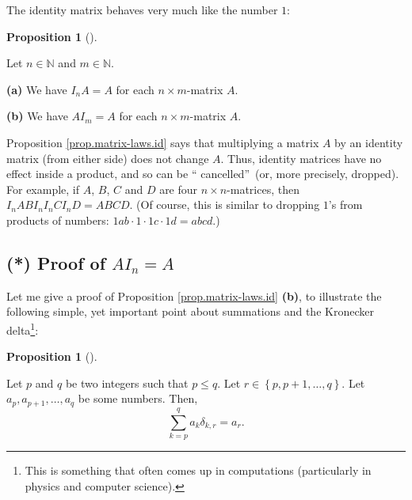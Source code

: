 \documentclass[numbers=enddot,12pt,final,onecolumn,notitlepage]{scrartcl}%
\theoremstyle{definition}
\newtheorem{prop}[theo]{Proposition}
\newenvironment{proposition}[1][]
{\begin{prop}[#1]\begin{leftbar}}
{\end{leftbar}\end{prop}}
\let\sumnonlimits\sum
\renewcommand{\sum}{\sumnonlimits\limits}
\begin{document}
The identity matrix behaves very much like the number $1$:

\begin{proposition}
\label{prop.matrix-laws.id}Let $n\in\mathbb{N}$ and $m\in\mathbb{N}$.

\textbf{(a)} We have $I_{n}A=A$ for each $n\times m$-matrix $A$.

\textbf{(b)} We have $AI_{m}=A$ for each $n\times m$-matrix $A$.
\end{proposition}

Proposition \ref{prop.matrix-laws.id} says that multiplying a matrix $A$ by an
identity matrix (from either side) does not change $A$. Thus, identity
matrices have no effect inside a product, and so can be \textquotedblleft
cancelled\textquotedblright\ (or, more precisely, dropped). For example, if
$A$, $B$, $C$ and $D$ are four $n\times n$-matrices, then $I_{n}ABI_{n}%
I_{n}CI_{n}D=ABCD$. (Of course, this is similar to dropping $1$'s from
products of numbers: $1ab\cdot1\cdot1c\cdot1d=abcd$.)

\subsection{(*) Proof of $AI_{n}=A$}

Let me give a proof of Proposition \ref{prop.matrix-laws.id} \textbf{(b)}, to
illustrate the following simple, yet important point about summations and the
Kronecker delta\footnote{This is something that often comes up in computations
(particularly in physics and computer science).}:

\begin{proposition}
\label{prop.sum.delta}Let $p$ and $q$ be two integers such that $p\leq q$. Let
$r\in\left\{  p,p+1,\ldots,q\right\}  $. Let $a_{p},a_{p+1},\ldots,a_{q}$ be
some numbers. Then,%
\[
\sum_{k=p}^{q}a_{k}\delta_{k,r}=a_{r}.
\]

\end{proposition}
\end{document}
